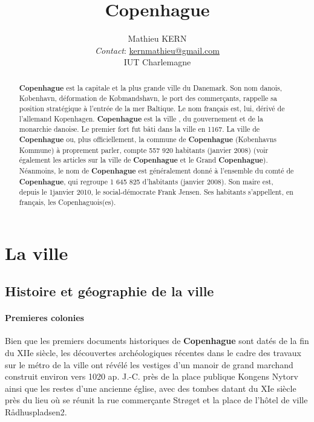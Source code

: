 \documentclass[a4paper,10pt,openany]{memoir}
\title{\textbf{Copenhague}}
\author{Mathieu KERN\\
\emph{Contact}: \href{mailto:kernmathieu@gmail.com}{kernmathieu@gmail.com}\\
IUT Charlemagne\\
}
\begin{document}
\maketitle
\begin{abstract}
\large{
\textbf{Copenhague} est la capitale et la plus grande ville du Danemark. Son nom danois, København,
déformation de Købmandshavn, le port des commerçants, rappelle sa position stratégique à l'entrée de la 
mer Baltique. Le nom français est, lui, dérivé de l'allemand Kopenhagen.
\textbf{Copenhague} est la ville , du gouvernement et de la monarchie danoise.
Le premier fort fut bâti dans la ville en 1167. La ville de \textbf{Copenhague} ou, 
plus officiellement, la commune de \textbf{Copenhague} (Københavns Kommune) à proprement parler, 
compte 557 920 habitants (janvier 2008) (voir également les articles sur la ville de \textbf{Copenhague} 
et le Grand \textbf{Copenhague}). Néanmoins, le nom de \textbf{Copenhague} est généralement donné à l'ensemble du 
comté de \textbf{Copenhague}, qui regroupe 1 645 825 d'habitants (janvier 2008).
Son maire est, depuis le 1\ier janvier 2010, le social-démocrate Frank Jensen.
Ses habitants s'appellent, en français, les Copenhaguois(es).}
\end{abstract}
\pagebreak

\tableofcontents

\part{La ville}

\chapter{Histoire et géographie de la ville}

\subsection*{Premieres colonies}
{\footnotesize
Bien que les premiers documents historiques de \textbf{Copenhague} sont datés de la fin du XIIe siècle,
les découvertes archéologiques récentes dans le cadre des travaux sur le métro de la ville ont révélé
les vestiges d'un manoir de grand marchand construit environ vers 1020 ap. J.-C. près de la place 
publique Kongens Nytorv ainsi que les restes d'une ancienne église, avec des tombes datant du XIe 
siècle près du lieu où se réunit la rue commerçante Strøget et la place de l'hôtel de ville Rådhuspladsen2.}
\end{document}
